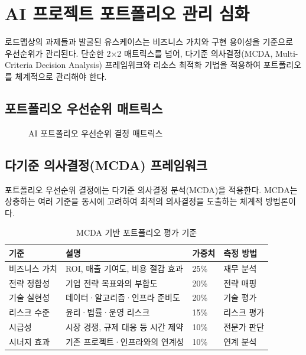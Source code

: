 \section{AI 프로젝트 포트폴리오 관리 심화}
\label{sec:8.5}

로드맵상의 과제들과 발굴된 유스케이스는 비즈니스 가치와 구현 용이성을 기준으로 우선순위가 관리된다. 단순한 2$\times$2 매트릭스를 넘어, 다기준 의사결정\cite{barbosa2023mcdm}(MCDA, Multi-Criteria Decision Analysis) 프레임워크와 리소스 최적화 기법을 적용하여 포트폴리오를 체계적으로 관리해야 한다.

\subsection{포트폴리오 우선순위 매트릭스}
\label{sec:8.5.1}

\begin{figure}[htbp]
\centering
{}
\caption{AI 포트폴리오 우선순위 결정 매트릭스}
\label{fig:portfolio_matrix}
\end{figure}

\subsection{다기준 의사결정(MCDA) 프레임워크}
\label{sec:8.5.2}

포트폴리오 우선순위 결정에는 다기준 의사결정 분석(MCDA)을 적용한다. MCDA는 상충하는 여러 기준을 동시에 고려하여 최적의 의사결정을 도출하는 체계적 방법론이다.

\begin{table}[htbp]
\centering
\caption{MCDA 기반 포트폴리오 평가 기준}
\label{tab:mcda_criteria}
\begin{tabularx}{\textwidth}{p{2.5cm}Xp{2cm}p{2cm}}
\toprule
\textbf{기준} & \textbf{설명} & \textbf{가중치} & \textbf{측정 방법} \\
\midrule
비즈니스 가치 & ROI, 매출 기여도, 비용 절감 효과 & 25\% & 재무 분석 \\
전략 정합성 & 기업 전략 목표와의 부합도 & 20\% & 전략 매핑 \\
기술 실현성 & 데이터·알고리즘·인프라 준비도 & 20\% & 기술 평가 \\
리스크 수준 & 윤리·법률·운영 리스크 & 15\% & 리스크 평가 \\
시급성 & 시장 경쟁, 규제 대응 등 시간 제약 & 10\% & 전문가 판단 \\
시너지 효과 & 기존 프로젝트·인프라와의 연계성 & 10\% & 연계 분석 \\
\bottomrule
\end{tabularx}
\end{table}

